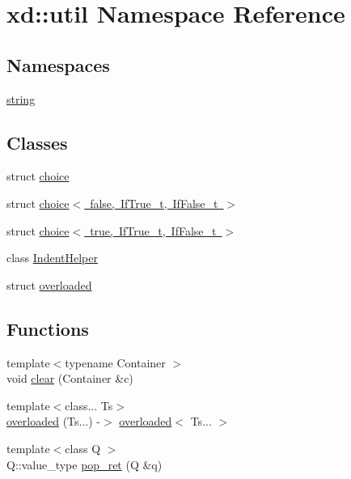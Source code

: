 \hypertarget{namespacexd_1_1util}{}\section{xd\+:\+:util Namespace Reference}
\label{namespacexd_1_1util}
\subsection*{Namespaces}
\begin{DoxyCompactItemize}
\item 
 \mbox{\hyperlink{namespacexd_1_1util_1_1string}{string}}
\end{DoxyCompactItemize}
\subsection*{Classes}
\begin{DoxyCompactItemize}
\item 
struct \mbox{\hyperlink{structxd_1_1util_1_1choice}{choice}}
\item 
struct \mbox{\hyperlink{structxd_1_1util_1_1choice_3_01false_00_01_if_true__t_00_01_if_false__t_01_4}{choice$<$ false, If\+True\+\_\+t, If\+False\+\_\+t $>$}}
\item 
struct \mbox{\hyperlink{structxd_1_1util_1_1choice_3_01true_00_01_if_true__t_00_01_if_false__t_01_4}{choice$<$ true, If\+True\+\_\+t, If\+False\+\_\+t $>$}}
\item 
class \mbox{\hyperlink{classxd_1_1util_1_1_indent_helper}{Indent\+Helper}}
\item 
struct \mbox{\hyperlink{structxd_1_1util_1_1overloaded}{overloaded}}
\end{DoxyCompactItemize}
\subsection*{Functions}
\begin{DoxyCompactItemize}
\item 
{\footnotesize template$<$typename Container $>$ }\\void \mbox{\hyperlink{namespacexd_1_1util_a4f903686b50813e35a4b5b18d56a1692}{clear}} (Container \&c)
\item 
{\footnotesize template$<$class... Ts$>$ }\\\mbox{\hyperlink{namespacexd_1_1util_a96cc83e3590a953a623c27d29bbf84b1}{overloaded}} (Ts...) -\/$>$ \mbox{\hyperlink{structxd_1_1util_1_1overloaded}{overloaded}}$<$ Ts... $>$
\item 
{\footnotesize template$<$class Q $>$ }\\Q\+::value\+\_\+type \mbox{\hyperlink{namespacexd_1_1util_aaf1057584ddba39b944a16b638449734}{pop\+\_\+ret}} (Q \&q)
\end{DoxyCompactItemize}


